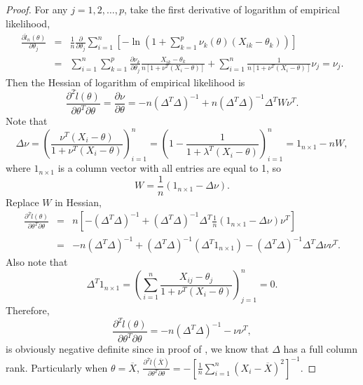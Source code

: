 \documentclass[oneside,english]{amsbook}
\numberwithin{section}{chapter}
\numberwithin{equation}{section}
\numberwithin{figure}{section}
\theoremstyle{plain}
\theoremstyle{plain}
\theoremstyle{definition}
\theoremstyle{plain}
\theoremstyle{plain}
\theoremstyle{remark}
\theoremstyle{definition}
\theoremstyle{definition}
\begin{document}
\begin{proof}
For any $j=1,2,\ldots,p$, take the first derivative of logarithm
of empirical likelihood,
\begin{eqnarray*}
\frac{\partial\hat{l}_{n}\left(\theta\right)}{\partial\theta_{j}} & = & \frac{1}{n}\frac{\partial}{\partial\theta_{j}}\sum_{i=1}^{n}\left[-\ln\left(1+\sum_{k=1}^{p}\nu_{k}\left(\theta\right)\left(X_{ik}-\theta_{k}\right)\right)\right]\\
 & = & \sum_{i=1}^{n}\sum_{k=1}^{p}\frac{\partial\nu_{k}}{\partial\theta_{j}}\frac{X_{ik}-\theta_{k}}{n\left[1+\nu^{T}\left(X_{i}-\theta\right)\right]}+\sum_{i=1}^{n}\frac{1}{n\left[1+\nu^{T}\left(X_{i}-\theta\right)\right]}\nu_{j}=\nu_{j}.
\end{eqnarray*}
Then the Hessian of logarithm of empirical likelihood is 
\[
\frac{\partial^{2}\hat{l}\left(\theta\right)}{\partial\theta^{T}\partial\theta}=\frac{\partial\nu}{\partial\theta}=-n\left(\Delta^{T}\Delta\right)^{-1}+n\left(\Delta^{T}\Delta\right)^{-1}\Delta^{T}W\nu^{T}.
\]
Note that 
\[
\Delta\nu=\left(\frac{\nu^{T}\left(X_{i}-\theta\right)}{1+\nu^{T}\left(X_{i}-\theta\right)}\right)_{i=1}^{n}=\left(1-\frac{1}{1+\lambda^{T}\left(X_{i}-\theta\right)}\right)_{i=1}^{n}=1_{n\times1}-nW,
\]
where $1_{n\times1}$ is a column vector with all entries are equal
to 1, so 
\[
W=\frac{1}{n}\left(1_{n\times1}-\Delta\nu\right).
\]
 Replace $W$ in Hessian, 
\begin{eqnarray*}
\frac{\partial^{2}\hat{l}\left(\theta\right)}{\partial\theta^{T}\partial\theta} & = & n\left[-\left(\Delta^{T}\Delta\right)^{-1}+\left(\Delta^{T}\Delta\right)^{-1}\Delta^{T}\frac{1}{n}\left(1_{n\times1}-\Delta\nu\right)\nu^{T}\right]\\
 & = & -n\left(\Delta^{T}\Delta\right)^{-1}+\left(\Delta^{T}\Delta\right)^{-1}\left(\Delta^{T}1_{n\times1}\right)-\left(\Delta^{T}\Delta\right)^{-1}\Delta^{T}\Delta\nu\nu^{T}.
\end{eqnarray*}
Also note that 
\[
\Delta^{T}1_{n\times1}=\left(\sum_{i=1}^{n}\frac{X_{ij}-\theta_{j}}{1+\nu^{T}\left(X_{i}-\theta\right)}\right)_{j=1}^{n}=0.
\]
Therefore,
\begin{equation}
\frac{\partial^{2}\hat{l}\left(\theta\right)}{\partial\theta^{T}\partial\theta}=-n\left(\Delta^{T}\Delta\right)^{-1}-\nu\nu^{T},\label{eq:expression-fisher-inf-mat}
\end{equation}
is obviously negative definite since in proof of ,
we know that $\Delta$ has a full column rank. Particularly when $\theta=\overline{X}$,
$\frac{\partial^{2}\hat{l}\left(\overline{X}\right)}{\partial\theta^{T}\partial\theta}=-\left[\frac{1}{n}\sum_{i=1}^{n}\left(X_{i}-\overline{X}\right)^{2}\right]^{-1}$. 
\end{proof}
\end{document}

